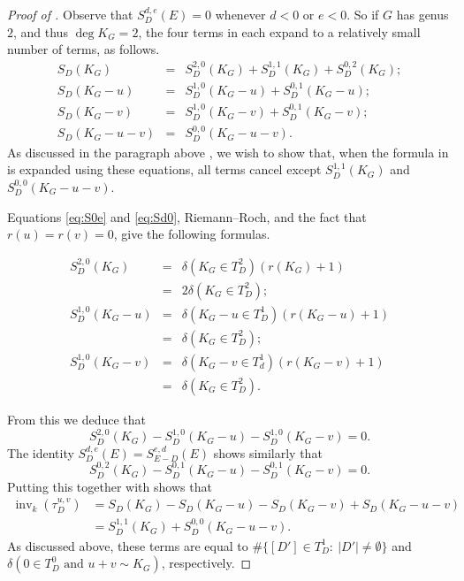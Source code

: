 \documentclass[11pt]{article}
\theoremstyle{definition}
\numberwithin{equation}{section}
\newcommand{\inv}{\operatorname{inv}}
\newcommand{\tauD}{\tau^{u,v}_D}
\begin{document}
\begin{proof}[Proof of ] \label{proof:invtau}
Observe that $S^{d,e}_D(E) = 0$ whenever $d<0$ or $e<0$. So if $G$ has genus $2$, and thus $\deg K_G = 2$, the four terms in  each expand to a relatively small number of terms, as follows.
\begin{eqnarray*}
S_D(K_G) &=& S^{2,0}_D(K_G) + S^{1,1}_D(K_G) + S^{0,2}_D(K_G);\\
S_D(K_G-u) &=& S^{1,0}_D(K_G-u) + S^{0,1}_D(K_G-u);\\
S_D(K_G-v) &=& S^{1,0}_D(K_G-v) + S^{0,1}_D(K_G-v);\\
S_D(K_G-u-v) &=& S^{0,0}_D(K_G-u-v).
\end{eqnarray*}
As discussed in the paragraph above , we wish to show that, when the formula in  is expanded using these equations, all terms cancel except $S^{1,1}_D(K_G)$ and $S^{0,0}_D(K_G-u-v)$.

Equations \eqref{eq:S0e} and \eqref{eq:Sd0}, Riemann--Roch, and the fact that $r(u) = r(v) = 0$, give the following formulas.

\begin{eqnarray*}
S^{2,0}_D(K_G) &=& \delta( K_G \in T^2_D) \left( r(K_G) + 1 \right)\\
&=& 2 \delta( K_G \in T^2_D);\\
S^{1,0}_D(K_G-u) &=& \delta(K_G - u \in T^1_D) \left( r(K_G-u) + 1 \right)\\
&=& \delta(K_G \in T^2_D);\\
S^{1,0}_D(K_G-v) &=& \delta( K_G -v \in T^1_d) \left( r(K_G-v) + 1 \right) \\
&=& \delta( K_G \in T^2_D).
\end{eqnarray*}

From this we deduce that
$$S^{2,0}_D(K_G) - S^{1,0}_D(K_G-u) - S^{1,0}_D(K_G-v) = 0.$$
The identity $S^{d,e}_D(E) = S^{e,d}_{E-D}(E)$ shows similarly that
$$S^{0,2}_D(K_G) - S^{0,1}_D(K_G-u) - S^{0,1}_D(K_G-v) = 0.$$
Putting this together with  shows that
\begin{align*}
\inv_k(\tauD) &= S_D(K_G) - S_D(K_G-u) - S_D(K_G-v) + S_D(K_G-u-v) \\&= S^{1,1}_D(K_G) + S^{0,0}_D(K_G-u-v).
\end{align*}
As discussed above, these terms are equal to $\# \{ [D'] \in T^1_D:\ |D'| \neq \emptyset \}$ and $\delta( 0 \in T^0_D \mbox{ and } u+v \sim K_G)$, respectively.
\end{proof}
\end{document}

